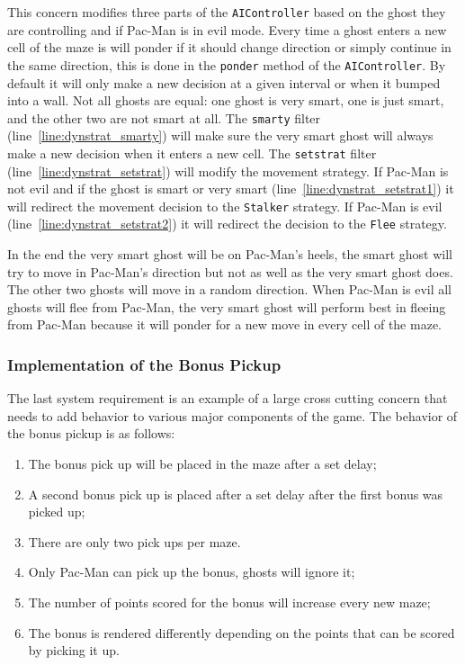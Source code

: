 This concern modifies three parts of the \lstinline|AIController| based on the ghost they are controlling and if Pac-Man is in evil mode. 
Every time a ghost enters a new cell of the maze is will ponder if it should change direction or simply continue in the same direction, this is done in the \lstinline|ponder| method of the \lstinline|AIController|. 
By default it will only make a new decision at a given interval or when it bumped into a wall. 
Not all ghosts are equal: one ghost is very smart, one is just smart, and the other two are not smart at all. 
The \lstinline|smarty| filter (line~\ref{line:dynstrat_smarty}) will make sure the very smart ghost will always make a new decision when it enters a new cell. 
The \lstinline|setstrat| filter (line~\ref{line:dynstrat_setstrat}) will modify the movement strategy. 
If Pac-Man is not evil and if the ghost is smart or very smart (line~\ref{line:dynstrat_setstrat1}) it will redirect the movement decision to the \lstinline|Stalker| strategy. 
If Pac-Man is evil (line~\ref{line:dynstrat_setstrat2}) it will redirect the decision to the \lstinline|Flee| strategy.

In the end the very smart ghost will be on Pac-Man's heels, the smart ghost will try to move in Pac-Man's direction but not as well as the very smart ghost does. 
The other two ghosts will move in a random direction. 
When Pac-Man is evil all ghosts will flee from Pac-Man, the very smart ghost will perform best in fleeing from Pac-Man because it will ponder for a new move in every cell of the maze.

\subsubsection{Implementation of the Bonus Pickup}
\label{sec:ImplementationOfTheBonusPickup}

The last system requirement is an example of a large cross cutting concern that needs to add behavior to various major components of the game.
The behavior of the bonus pickup is as follows:
\begin{enumerate}[noitemsep]
	\samepage
	\item The bonus pick up will be placed in the maze after a set delay;
	\item A second bonus pick up is placed after a set delay after the first bonus was picked up;	
	\item There are only two pick ups per maze.
	\item Only Pac-Man can pick up the bonus, ghosts will ignore it;
	\item The number of points scored for the bonus will increase every new maze;
	\item The bonus is rendered differently depending on the points that can be scored by picking it up.
\end{enumerate}

